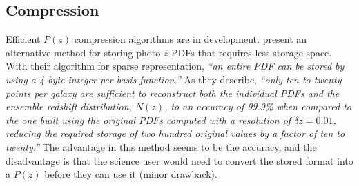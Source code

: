 \documentclass[DM,lsstdraft,toc]{lsstdoc}
\begin{document}
%
%

\subsection{Compression}\label{ssec:tech_compress}

Efficient $P(z)$ compression algorithms are in development. \citet{2014MNRAS.441.3550C} present an alternative method for storing photo-$z$ PDFs that requires less storage space. With their algorithm for sparse representation, {\it ``an entire PDF can be stored by using a 4-byte integer per basis function.''} As they describe, {\it ``only ten to twenty points per galaxy are sufficient to reconstruct both the individual PDFs and the ensemble redshift distribution, $N(z)$, to an accuracy of 99.9\% when compared to the one built using the original PDFs computed with a resolution of $\delta z = 0.01$, reducing the required storage of two hundred original values by a factor of ten to twenty.''} The advantage in this method seems to be the accuracy, and the disadvantage is that the science user would need to convert the stored format into a $P(z)$ before they can use it (minor drawback).
\end{document}
